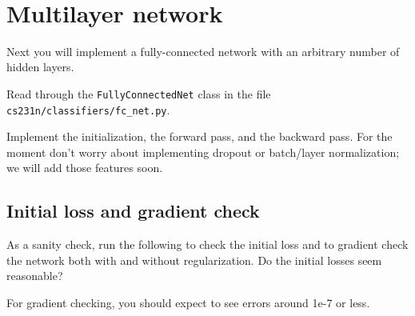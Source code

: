 \documentclass[11pt]{article}
\begin{document}
    \begin{center}
    \end{center}
    { \hspace*{\fill} \\}
    
    \hypertarget{multilayer-network}{%
\section{Multilayer network}\label{multilayer-network}}

Next you will implement a fully-connected network with an arbitrary
number of hidden layers.

Read through the \texttt{FullyConnectedNet} class in the file
\texttt{cs231n/classifiers/fc\_net.py}.

Implement the initialization, the forward pass, and the backward pass.
For the moment don't worry about implementing dropout or batch/layer
normalization; we will add those features soon.

    \hypertarget{initial-loss-and-gradient-check}{%
\subsection{Initial loss and gradient
check}\label{initial-loss-and-gradient-check}}

As a sanity check, run the following to check the initial loss and to
gradient check the network both with and without regularization. Do the
initial losses seem reasonable?

For gradient checking, you should expect to see errors around 1e-7 or
less.
\end{document}
